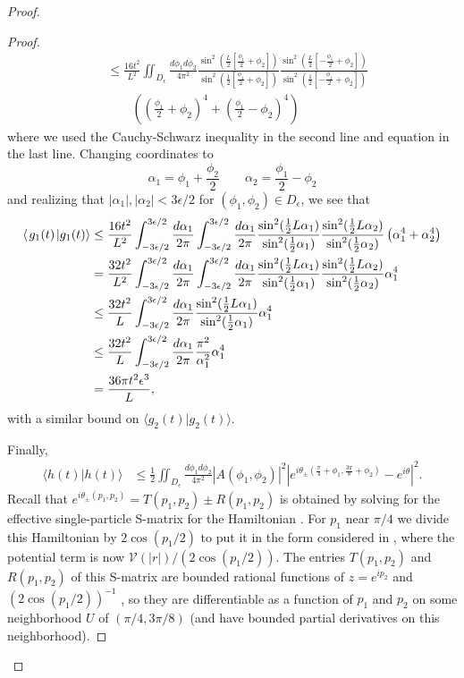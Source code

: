 \documentclass[../thesis-main/thesis-main]{subfiles}
\begin{document}
\begin{proof}
\begin{proof}
\begin{align*}
 & \leq  \frac{16 t^{2}}{L^2} \iint_{D_{\epsilon}}\frac{d\phi_{1}d\phi_{2}}{4\pi^{2}}
	  \frac{\sin^2(\frac{L}{2} [\frac{\phi_1}{2} + \phi_2])}
	 {\sin^2(\frac{1}{2} [\frac{\phi_1}{2} + \phi_2])}
	 \frac{\sin^2(\frac{L}{2} [-\frac{\phi_1}{2} + \phi_2])}
	 {\sin^2(\frac{1}{2} [-\frac{\phi_1}{2} + \phi_2])}\\
 & \qquad \left(\left(\frac{\phi_1}{2}+ \phi_2\right)^4 
 	+ \left(\frac{\phi_1}{2} - \phi_2\right)^4\right)
\end{align*}
where we used the Cauchy-Schwarz inequality in the second line and equation  in the last line.  Changing coordinates to
\[
  \alpha_1 = \phi_1 + \frac{ \phi_2}{2} \qquad \alpha_2 = \frac{\phi_1}{2} -\phi_2 
 \]
and realizing that $|\alpha_1|,|\alpha_2| < 3\epsilon/2$ for $(\phi_1,\phi_2)\in D_{\epsilon}$, we see that
\begin{align*}
  \langle\mspace{2mu} g_1(t) \mspace{2mu} | g_1(t)\rangle &\leq \frac{16t^2}{L^2} \int_{-{3\epsilon/2}}^{3\epsilon/2} \frac{d\alpha_1}{2\pi}
      \int_{-{3\epsilon/2}}^{3\epsilon/2} \frac{d\alpha_1}{2\pi} 
      \frac{\sin^2(\frac{1}{2} L\alpha_1)}
	 {\sin^2(\frac{1}{2} \alpha_1)}
	 \frac{\sin^2(\frac{1}{2} L\alpha_2)}
	 {\sin^2(\frac{1}{2} \alpha_2)} \left(\alpha_1^4+\alpha_2^4\right)\\
   &= \frac{32t^2}{L^2} \int_{-{3\epsilon/2}}^{3\epsilon/2} \frac{d\alpha_1}{2\pi}
      \int_{-{3\epsilon/2}}^{3\epsilon/2} \frac{d\alpha_1}{2\pi}
      \frac{\sin^2(\frac{1}{2} L\alpha_1)}
	 {\sin^2(\frac{1}{2} \alpha_1)}
	 \frac{\sin^2(\frac{1}{2} L\alpha_2)}
	 {\sin^2(\frac{1}{2} \alpha_2)} \alpha_1^4\\
   &\leq \frac{32t^2}{L} \int_{-3\epsilon/2}^{3\epsilon/2} \frac{d\alpha_1}{2\pi}  
     \frac{\sin^2(\frac{1}{2} L\alpha_1)}
	 {\sin^2(\frac{1}{2} \alpha_1)} \alpha_1^4\\
   &\leq \frac{32 t^2}{L} \int_{-3\epsilon/2}^{3\epsilon/2} \frac{d\alpha_1}{2\pi} \frac{\pi^2}{\alpha_1^2} \alpha_1^4\\
   &= \frac{36 \pi t^2\epsilon^3}{L},
\end{align*}
with a similar bound on $\langle g_{2}(t)|g_{2}(t)\rangle$.
 
Finally, 
\begin{align*}
\langle h(t)|h(t)\rangle & \leq  \frac{1}{2}\iint_{D_{\epsilon}}\frac{d\phi_{1}d\phi_{2}}{4\pi^{2}}
	\left|A(\phi_{1},\phi_{2})\right|^{2}\left|e^{i\theta_\pm (\tfrac{\pi}{4}+\phi_{1},
	\tfrac{3\pi}{8}+\phi_{2})}-e^{i\theta}\right|^{2}.
 \end{align*}
Recall that $e^{i\theta_\pm (p_1,p_2)}=T(p_1,p_2) \pm R(p_1,p_2)$ is obtained by solving for the effective single-particle S-matrix for the Hamiltonian . For $p_1$ near ${\pi}/{4}$ we divide this Hamiltonian by $2\cos({p_1}/{2})$ to put it in the form considered in \cite{Childs_Gosset}, where the potential term is now $\mathcal{V}(|r|)/(2\cos({p_1}/{2}))$. The entries $T(p_1,p_2)$ and $R(p_1,p_2)$ of this S-matrix are bounded rational functions of $z=e^{ip_2}$ and $(2\cos({p_1}/{2}))^{-1}$ \cite{Childs_Gosset}, so they are differentiable as a function of $p_1$ and $p_2$ on some neighborhood $U$ of $({\pi}/{4},{3\pi}/{8})$ (and have bounded partial derivatives on this neighborhood).


\end{proof}
\end{proof}
\end{document}
